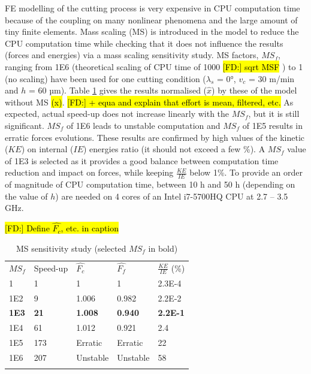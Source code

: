 \documentclass[final,5p,times,twocolumn]{elsarticle}
\DeclareRobustCommand{\FD}[1]{ {\begingroup\sethlcolor{VWgreen}\textcolor{black}{\hl{[FD:] #1}}\endgroup} }
\begin{document}
FE modelling of the cutting process is very expensive in CPU computation time because of the coupling on many nonlinear phenomena and the large amount of tiny finite elements. Mass scaling (MS) is introduced in the model to reduce the CPU computation time while checking that it does not influence the results (forces and energies) via a mass scaling sensitivity study.
MS factors, ${MS}_f$, ranging from 1E6 (theoretical scaling of CPU time of 1000\FD{sqrt MSF}) to 1 (no scaling) have been used for one cutting condition ($\lambda_s$ = 0°, $v_c$ = 30 m/min and $h$ = 60 µm). Table \ref{tab:MS} gives the results normalised ($\hat{x}$) by these of the model without MS \hl{(x)}.\FD{+ equa and explain that effort is mean, filtered, etc.} As expected, actual speed-up does not increase linearly with the ${MS}_f$, but it is still significant. ${MS}_f$ of 1E6 leads to unstable computation and ${MS}_f$ of 1E5 results in erratic forces evolutions. These results are confirmed by high values of the kinetic ($KE$) on internal ($IE$) energies ratio (it should not exceed a few \%). A ${MS}_f$ value of 1E3 is selected as it provides a good balance between computation time reduction and impact on forces, while keeping $\frac{KE}{IE}$ below 1\%. To provide an order of magnitude of CPU computation time, between 10 h and 50 h (depending on the value of $h$) are needed on 4 cores of an Intel i7-5700HQ CPU at 2.7 -- 3.5 GHz.

%
\begin{table}[!h]
\begin{center}
\caption{\label{tab:MS} MS sensitivity study (selected $MS_f$ in bold)}\FD{Define $\hat{F_c}$, etc. in caption}
\begin{tabular}{lllll}
\hline\noalign{\smallskip}
$MS_f$  & Speed-up & $\hat{F_c}$ & $\hat{F_f}$ & $\frac{KE}{IE}$ (\%)\\
\noalign{\smallskip}\hline\noalign{\smallskip}
1 & 1 & 1 & 1 & 2.3E-4\\
1E2 & 9 & 1.006 & 0.982 & 2.2E-2\\
\textbf{1E3} & \textbf{21} & \textbf{1.008} & \textbf{0.940} & \textbf{2.2E-1}\\
1E4 & 61 & 1.012 & 0.921 & 2.4\\
1E5 & 173 & Erratic & Erratic & 22\\
1E6 & 207 & Unstable & Unstable & 58\\
\noalign{\smallskip}\hline
\end{tabular}
\end{center}
\end{table}
%
\end{document}
